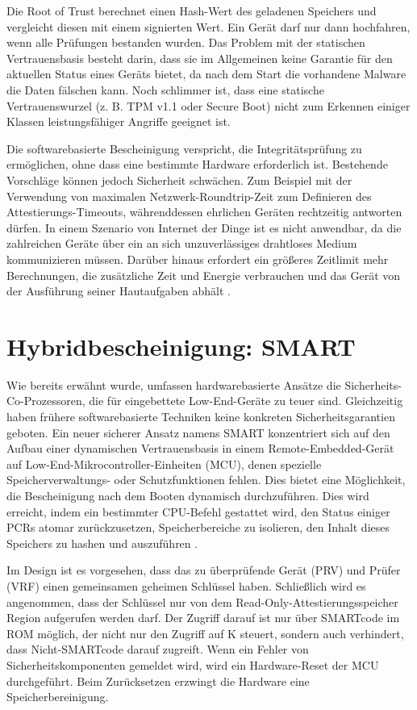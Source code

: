 Die Root of Trust berechnet einen Hash-Wert des geladenen Speichers und vergleicht diesen mit einem signierten Wert. Ein Gerät darf nur dann hochfahren, wenn alle Prüfungen bestanden wurden. Das Problem mit der statischen Vertrauensbasis besteht darin, dass sie im Allgemeinen keine Garantie für den aktuellen Status eines Geräts bietet, da nach dem Start die vorhandene Malware die Daten fälschen kann. Noch schlimmer ist, dass eine statische Vertrauenswurzel (z. B. TPM v1.1 oder Secure Boot) nicht zum Erkennen einiger Klassen leistungsfähiger Angriffe geeignet ist.

Die softwarebasierte Bescheinigung verspricht, die Integritätsprüfung zu ermöglichen, ohne dass eine bestimmte Hardware erforderlich ist. Bestehende Vorschläge können jedoch Sicherheit schwächen. Zum Beispiel mit der Verwendung von maximalen Netzwerk-Roundtrip-Zeit zum Definieren des Attestierungs-Timeouts, währenddessen ehrlichen Geräten rechtzeitig antworten dürfen. In einem Szenario von Internet der Dinge ist es nicht anwendbar, da die zahlreichen Geräte über ein an sich unzuverlässiges drahtloses Medium kommunizieren müssen. Darüber hinaus erfordert ein größeres Zeitlimit mehr Berechnungen, die zusätzliche Zeit und Energie verbrauchen und das Gerät von der Ausführung seiner Hautaufgaben abhält \cite{website:softAtt}. 

\section{Hybridbescheinigung: SMART}
\label{sec:sicher:smart}
Wie bereits erwähnt wurde, umfassen hardwarebasierte Ansätze die Sicherheits-Co-Prozessoren, die für eingebettete Low-End-Geräte zu teuer sind. Gleichzeitig haben frühere softwarebasierte Techniken keine konkreten Sicherheitsgarantien geboten. Ein neuer sicherer Ansatz namens SMART konzentriert sich auf den Aufbau einer dynamischen Vertrauensbasis in einem Remote-Embedded-Gerät auf Low-End-Mikrocontroller-Einheiten (MCU), denen spezielle Speicherverwaltungs- oder Schutzfunktionen fehlen. Dies bietet eine Möglichkeit, die Bescheinigung nach dem Booten dynamisch durchzuführen. Dies wird erreicht, indem ein bestimmter CPU-Befehl gestattet wird, den Status einiger PCRs atomar zurückzusetzen, Speicherbereiche zu isolieren, den Inhalt dieses Speichers zu hashen und auszuführen \cite[p.12]{website:smart}. 

Im Design ist es vorgesehen, dass das zu überprüfende Gerät (PRV) und Prüfer (VRF) einen gemeinsamen geheimen Schlüssel haben. Schließlich wird es angenommen, dass der Schlüssel  nur von dem Read-Only-Attestierungsspeicher Region aufgerufen werden darf. Der Zugriff darauf ist nur über SMARTcode im ROM möglich, der nicht nur den Zugriff auf K steuert, sondern auch verhindert, dass Nicht-SMARTcode darauf zugreift. Wenn ein Fehler von Sicherheitskomponenten gemeldet wird, wird ein Hardware-Reset der MCU durchgeführt. Beim Zurücksetzen erzwingt die Hardware eine Speicherbereinigung.


